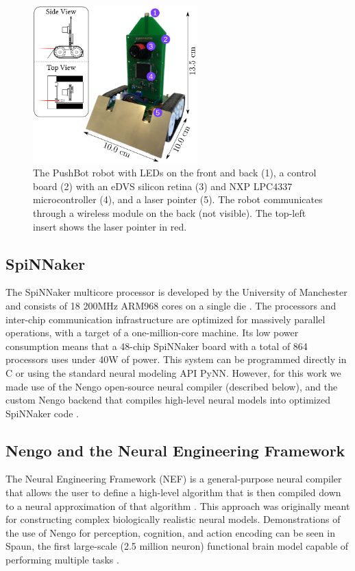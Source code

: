 \documentclass{frontiersSCNS}
\begin{document}
\begin{figure}[!t]
\centering
\includegraphics[width=2.5in]{../figures/Pushbot.png}
\caption{The PushBot robot with LEDs on the front and back (1), a control
board (2) with an eDVS silicon retina (3) and NXP LPC4337 microcontroller (4),
and a laser pointer (5).  The robot communicates through a wireless module on
the back (not visible).  The top-left insert shows the laser pointer in red.}
\label{fig_sim}
\end{figure}


\subsection{SpiNNaker}

The SpiNNaker multicore processor is developed by the University of Manchester 
and consists of 18 200MHz ARM968 cores on a single die \citep{furber2007neural, furber2014spinnaker}. 
The processors and inter-chip communication infrastructure are optimized for
massively parallel operations, with a target of a one-million-core machine.  Its
low power consumption means that a 48-chip SpiNNaker board with a total of 
864 processors uses under 40W of power. This system can be programmed directly 
in C or using the standard neural modeling API PyNN. However, for this work
we made use of the Nengo open-source neural compiler \citep{bekolay_nengo2014} 
(described below), and the custom Nengo backend that compiles high-level
neural models into optimized SpiNNaker code \citep{mundy2015}.

\subsection{Nengo and the Neural Engineering Framework}

The Neural Engineering Framework (NEF) is a general-purpose neural compiler 
that allows the user to define a high-level algorithm that is then compiled 
down to a neural approximation of that algorithm \citep{eliasmith2004neural}. 
This approach was originally meant for constructing complex biologically realistic neural 
models. Demonstrations of the use of Nengo for perception, cognition, and 
action encoding can be seen in Spaun, the first large-scale 
(2.5 million neuron) functional brain model capable of performing multiple 
tasks  \citep{eliasmith_largescale_2012}. 
\end{document}
